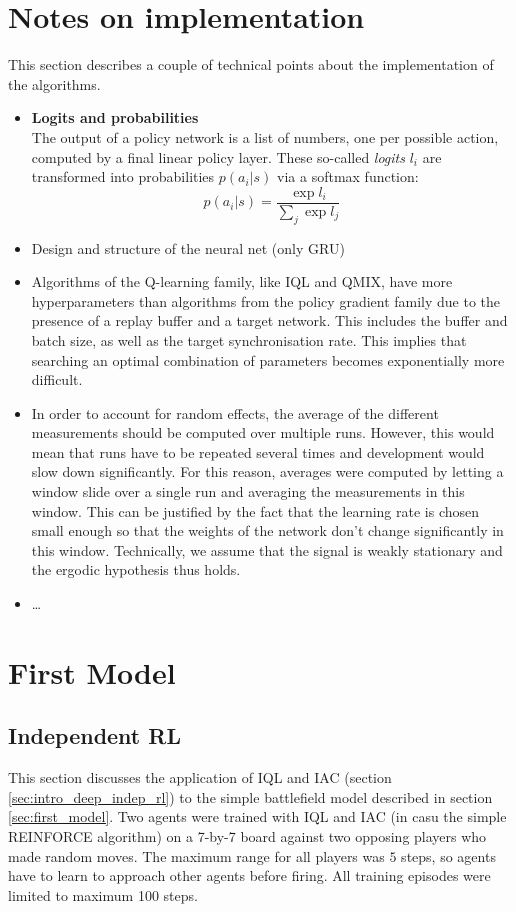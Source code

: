 \section{Notes on implementation}
This section describes a couple of technical points about the implementation of the algorithms.
\begin{itemize}
    \item \textbf{Logits and probabilities}\\
        The output of a policy network is a list of numbers, one per possible action, computed by a final linear policy layer. These so-called \emph{logits} $l_i$ are transformed into probabilities $p(a_i | s)$ via a softmax function:
        \begin{equation}
            p(a_i | s) = \frac{\exp{l_i}}{\sum_j \exp{l_j}}
        \end{equation}
    \item Design and structure of the neural net (only GRU)
    \item Algorithms of the Q-learning family, like IQL and QMIX, have more hyperparameters than algorithms from the policy gradient family due to the presence of a replay buffer and a target network. This includes the buffer and batch size, as well as the target synchronisation rate. This implies that searching an optimal combination of parameters becomes exponentially more difficult.
    \item In order to account for random effects, the average of the different measurements should be computed over multiple runs. However, this would mean that runs have to be repeated several times and development would slow down significantly. For this reason, averages were computed by letting a window slide over a single run and averaging the measurements in this window. This can be justified by the fact that the learning rate is chosen small enough so that the weights of the network don't change significantly in this window. Technically, we assume that the signal is weakly stationary and the ergodic hypothesis thus holds.
    \item \ldots
\end{itemize}

\section{First Model}
\subsection{Independent RL}
\label{sec:iql_applied}
This section discusses the application of IQL and IAC (section \ref{sec:intro_deep_indep_rl}) to the simple battlefield model described in section \ref{sec:first_model}. Two agents were trained with IQL and IAC (in casu the simple REINFORCE algorithm) on a 7-by-7 board against two opposing players who made random moves. The maximum range for all players was $5$ steps, so agents have to learn to approach other agents before firing. All training episodes were limited to maximum 100 steps.\\

